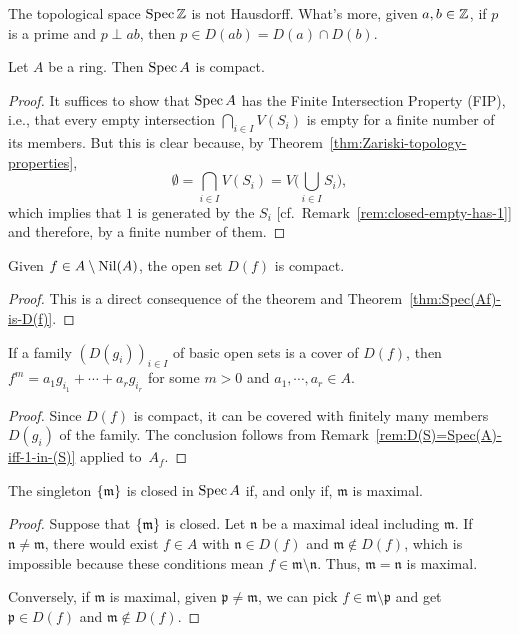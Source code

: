 \begin{rem}
    The topological space $\operatorname{Spec}\mathbb{Z}$ is not Hausdorff. What's more, given $a,b\in\mathbb{Z}$, if $p$ is a prime and $p\perp ab$, then $p\in D(ab)=D(a)\cap D(b)$.
\end{rem}

\begin{thm}\label{thm:Spec-is-compact}
    Let\/ $A$ be a ring. Then\/ $\operatorname{Spec} A$ is compact.
\end{thm}

\begin{proof}
    It suffices to show that $\operatorname{Spec} A$ has the Finite Intersection Property (FIP), i.e., that every empty intersection $\bigcap_{i\in I}V(S_i)$ is empty for a finite number of its members. But this is clear because, by Theorem~\ref{thm:Zariski-topology-properties},
    $$
        \emptyset=\bigcap_{i\in I}V(S_i) = V\bigg(\bigcup_{i\in I}S_i\bigg),
    $$
    which implies that $1$ is generated by the $S_i$ [cf.~Remark~\ref{rem:closed-empty-has-1}] and therefore, by a finite number of them.
\end{proof}

\begin{cor}\label{cor:D(f)-is-compact}
    Given $f\in A\setminus\operatorname{Nil}(A)$, the open set $D(f)$ is compact.
\end{cor}

\begin{proof}
    This is a direct consequence of the theorem and Theorem~\ref{thm:Spec(Af)-is-D(f)}.
\end{proof}

\begin{cor}\label{cor:nilpotent-and-cover}
    If a family\/ $(D(g_i))_{i\in I}$ of basic open sets is a cover of\/ $D(f)$, then\/ $f^m=a_1g_{i_1}+\cdots+a_rg_{i_r}$ for some\/ $m>0$ and\/ $a_1,\cdots, a_r\in A$.
\end{cor}

\begin{proof}
    Since $D(f)$ is compact, it can be covered with finitely many members $D(g_i)$ of the family. The conclusion follows from Remark~\ref{rem:D(S)=Spec(A)-iff-1-in-(S)} applied to~$A_f$.
\end{proof}

\begin{thm}
    The singleton\/ $\{\mathfrak m\}$ is closed in\/ $\operatorname{Spec} A$ if, and only if, $\mathfrak m$ is maximal.
\end{thm}

\begin{proof}
    Suppose that $\{\mathfrak m\}$ is closed. Let $\mathfrak n$ be a maximal ideal including $\mathfrak m$. If $\mathfrak n\ne\mathfrak m$, there would exist $f\in A$ with $\mathfrak n\in D(f)$ and $\mathfrak m\notin D(f)$, which is impossible because these conditions mean $f\in\mathfrak m\setminus\mathfrak n$. Thus, $\mathfrak m=\mathfrak n$ is maximal.

    Conversely, if $\mathfrak m$ is maximal, given $\mathfrak p\ne\mathfrak m$, we can pick $f\in\mathfrak m\setminus\mathfrak p$ and get $\mathfrak p\in D(f)$ and $\mathfrak m\notin D(f)$.
\end{proof}

